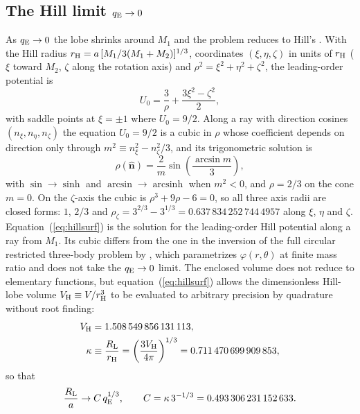 \documentclass[twocolumn]{aastex702}
\newcommand{\qE}{q_{\rm E}}
\newcommand{\RL}{R_{\rm L}}
\begin{document}
\subsection{The Hill limit $\qE\to0$}\label{sec:limit_hill}

As $\qE\to0$ the lobe shrinks around $M_1$ and the problem reduces to Hill's \citep{Hill1878,MurrayDermott1999}. With the Hill radius $r_{\rm H}=a\,[M_1/3(M_1+M_2)]^{1/3}$, coordinates $(\xi,\eta,\zeta)$ in units of $r_{\rm H}$ ($\xi$ toward $M_2$, $\zeta$ along the rotation axis) and $\rho^2=\xi^2+\eta^2+\zeta^2$, the leading-order potential is
\begin{equation}
U_0=\frac3\rho+\frac{3\xi^2-\zeta^2}{2},
\label{eq:U0}
\end{equation}
with saddle points at $\xi=\pm1$ where $U_0=9/2$. Along a ray with direction cosines $(n_\xi,n_\eta,n_\zeta)$ the equation $U_0=9/2$ is a cubic in $\rho$ whose coefficient depends on direction only through $m^2\equiv n_\xi^2-n_\zeta^2/3$, and its trigonometric solution is
\begin{equation}
\rho(\hat{\bm n})=\frac{2}{m}\sin\!\left(\frac{\arcsin m}{3}\right),
\label{eq:hillsurf}
\end{equation}
with $\sin\to\sinh$ and $\arcsin\to\operatorname{arcsinh}$ when $m^2<0$, and $\rho=2/3$ on the cone $m=0$. On the $\zeta$-axis the cubic is $\rho^3+9\rho-6=0$, so all three axis radii are closed forms: $1$, $2/3$ and $\rho_\zeta=3^{2/3}-3^{1/3}=0.637\,834\,252\,744\,4957$ along $\xi$, $\eta$ and $\zeta$. Equation~(\ref{eq:hillsurf}) is the solution for the leading-order Hill potential along a ray from $M_1$. Its cubic differs from the one in the inversion of the full circular restricted three-body problem by \citet{Hure2026}, which parametrizes $\varphi(r,\theta)$ at finite mass ratio and does not take the $\qE\to0$ limit. The enclosed volume does not reduce to elementary functions, but equation~(\ref{eq:hillsurf}) allows the dimensionless Hill-lobe volume $V_{\rm H}\equiv V/r_{\rm H}^3$ to be evaluated to arbitrary precision by quadrature without root finding:
\begin{align}
V_{\rm H}&=1.508\,549\,856\,131\,113,\\
\kappa&\equiv\frac{\RL}{r_{\rm H}}=\left(\frac{3V_{\rm H}}{4\pi}\right)^{1/3}=0.711\,470\,699\,909\,853,
\end{align}
so that
\begin{equation}
\frac{\RL}{a}\to C\,\qE^{1/3},\qquad C=\kappa\,3^{-1/3}=0.493\,306\,231\,152\,633.
\label{eq:C}
\end{equation}
\end{document}
